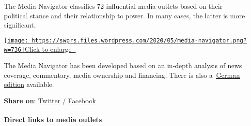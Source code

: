 The Media Navigator classifies 72 influential media outlets based on
their political stance and their relationship to power. In many cases,
the latter is more significant.

\href{https://swprs.files.wordpress.com/2020/05/media-navigator.png}{\texttt{[image: https://swprs.files.wordpress.com/2020/05/media-navigator.png?w=736]}}\href{https://swprs.files.wordpress.com/2020/05/media-navigator.png}{Click
to enlarge 🔎}

The Media Navigator has been developed based on an in-depth analysis of
news coverage, commentary, media ownership and financing. There is also
a~\href{https://swprs.org/medien-navigator/}{German edition} available.

\textbf{Share on}:
\href{https://twitter.com/intent/tweet?url=https://swprs.org/media-navigator/}{Twitter}
/
\href{https://www.facebook.com/share.php?u=https://swprs.org/media-navigator/}{Facebook}

\hypertarget{direct-links-to-media-outlets}{%
\paragraph{Direct links to media
outlets}\label{direct-links-to-media-outlets}}

